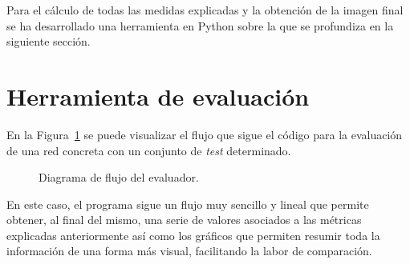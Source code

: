 Para el cálculo de todas las medidas explicadas y la obtención de la imagen final se ha desarrollado una herramienta en Python sobre la que se profundiza en la siguiente sección.

\section{Herramienta de evaluación}

En la Figura~\ref{fig.flujo_test} se puede visualizar el flujo que sigue el código para la evaluación de una red concreta con un conjunto de \textit{test} determinado.

\vspace{10pt}
\begin{figure}[H]
    \begin{center}
        \caption{Diagrama de flujo del evaluador.}
	    \label{fig.flujo_test}
	\end{center}
\end{figure}

En este caso, el programa sigue un flujo muy sencillo y lineal que permite obtener, al final del mismo, una serie de valores asociados a las métricas explicadas anteriormente así como los gráficos que permiten resumir toda la información de una forma más visual, facilitando la labor de comparación.\\

